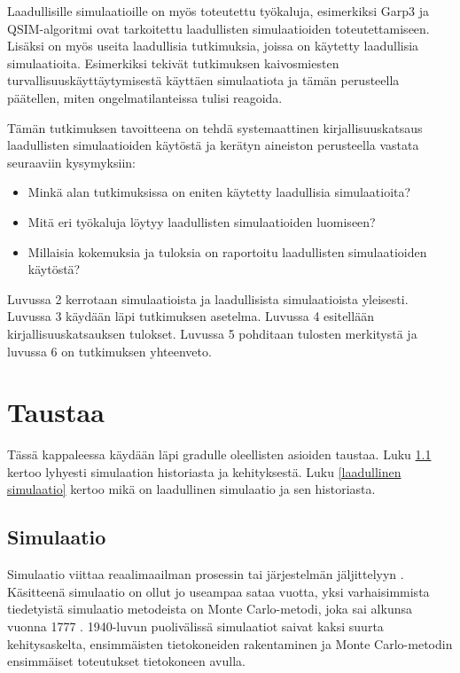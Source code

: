 \documentclass[utf8]{gradu3}
\begin{document}
Laadullisille simulaatioille on myös toteutettu työkaluja, esimerkiksi Garp3 \parencite{bredeweg2007garp3} ja QSIM-algoritmi \parencite{helgstrand2004qsim} ovat tarkoitettu laadullisten simulaatioiden toteutettamiseen. Lisäksi on myös useita laadullisia tutkimuksia, joissa on käytetty laadullisia simulaatioita. Esimerkiksi \cite{cao2019depth} tekivät tutkimuksen kaivosmiesten turvallisuuskäyttäytymisestä käyttäen simulaatiota ja tämän perusteella päätellen, miten ongelmatilanteissa tulisi reagoida. 

Tämän tutkimuksen tavoitteena on tehdä systemaattinen kirjallisuuskatsaus laadullisten simulaatioiden käytöstä ja kerätyn aineiston perusteella vastata seuraaviin kysymyksiin:
\begin{itemize}
    \item Minkä alan tutkimuksissa on eniten käytetty laadullisia simulaatioita?
    \item Mitä eri työkaluja löytyy laadullisten simulaatioiden luomiseen?
    \item Millaisia kokemuksia ja tuloksia on raportoitu laadullisten simulaatioiden käytöstä?
\end{itemize}

Luvussa 2 kerrotaan simulaatioista ja laadullisista simulaatioista yleisesti. Luvussa 3 käydään läpi tutkimuksen asetelma. Luvussa 4 esitellään kirjallisuuskatsauksen tulokset. Luvussa 5 pohditaan tulosten merkitystä ja luvussa 6 on tutkimuksen yhteenveto.

\chapter{Taustaa}
Tässä kappaleessa käydään läpi gradulle oleellisten asioiden taustaa. Luku \ref{simulaatio} kertoo lyhyesti simulaation historiasta ja kehityksestä. Luku \ref{laadullinen simulaatio} kertoo mikä on laadullinen simulaatio ja sen historiasta.

\section{Simulaatio} \label{simulaatio}
Simulaatio viittaa reaalimaailman prosessin tai järjestelmän jäljittelyyn \parencite{banks1999introduction}. Käsitteenä simulaatio on ollut jo useampaa sataa vuotta, yksi varhaisimmista tiedetyistä simulaatio metodeista on Monte Carlo-metodi, joka sai alkunsa vuonna 1777 \parencite{HistoryOfSimulation}. 1940-luvun puolivälissä simulaatiot saivat kaksi suurta kehitysaskelta, ensimmäisten tietokoneiden rakentaminen ja Monte Carlo-metodin ensimmäiset toteutukset tietokoneen avulla\parencite{HistoryOfSimulation}. 
\end{document}
